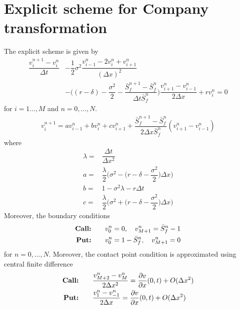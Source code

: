 
\section{Explicit scheme for Company transformation} 
The explicit scheme is given by
\begin{equation*}
    \begin{split}
      \dfrac{v^{n+1}_{i} - v^{n}_{i}}{\Delta{t}} & - \dfrac{1}{2}\sigma^2 \dfrac{v^{n}_{i-1} - 2v^{n}_{i} + v^{n}_{i+1}}{(\Delta{x})^2} \\ 
       & - \bigg( (r-\delta) - \dfrac{\sigma^2}{2} - \dfrac{\bar{S}^{n+1}_{f} - \bar{S}^{n}_{f}}{\Delta{t}\bar{S}^{n}_{f}} \bigg)\dfrac{v^{n}_{i+1} - v^{n}_{i-1}}{2\Delta{x}} + rv^{n}_{i} = 0
    \end{split}
\end{equation*}
for $i=1\dots,M$ and $n = 0,\dots,N$. 
\begin{equation*}
    \begin{split}
        v^{n+1}_{i} = av^{n}_{i-1} + bv^{n}_{i} + cv^{n}_{i+1} + \dfrac{\bar{S}^{n+1}_{f} - \bar{S}^{n}_{f}}{2\Delta{x}\bar{S}^{n}_{f}}(v^{n}_{i+1} - v^{n}_{i-1})
    \end{split}
\end{equation*}
where 
\begin{equation*}
    \begin{split}
        \lambda =& \dfrac{\Delta{t}}{\Delta{x}^2}\\
        a =& \dfrac{\lambda}{2}\bigg( \sigma^2 - \bigg(r - \delta - \dfrac{\sigma^2}{2}\bigg)\Delta{x} \bigg) \\
        b =& 1 - \sigma^2\lambda- r\Delta{t} \\
        c =& \dfrac{\lambda}{2}\bigg(\sigma^2 + \bigg(r - \delta - \dfrac{\sigma^2}{2}\bigg)\Delta{x}\bigg)
    \end{split}
\end{equation*}
Moreover, the boundary conditions 
\begin{equation*}
    \begin{split}
        \text{\textbf{Call:}} \qquad & v^{n}_{0} = 0, \quad v^{n}_{M+1} = \bar{S}^{n}_{f} - 1 \\
        \text{\textbf{Put:}} \qquad & v^{n}_{0} = 1 - \bar{S}^{n}_{f}, \quad v^{n}_{M+1} = 0 \\
    \end{split}
\end{equation*}
for $n=0,\dots,N$. Moreover, the contact point condition is approximated using central finite difference
\begin{align*}
    \text{\textbf{Call:}} \qquad & \dfrac{v^{n}_{M+2} - v^{n}_{M}}{2\Delta{x}^2} = \dfrac{\partial{v}}{\partial{x}}(0, t) + O(\Delta{x}^2) \\
    \text{\textbf{Put:}} \qquad & \dfrac{v^{n}_{1} - v^{n}_{-1}}{2\Delta{x}} = \dfrac{\partial{v}}{\partial{x}}(0, t)+ O(\Delta{x}^2) 
\end{align*}

